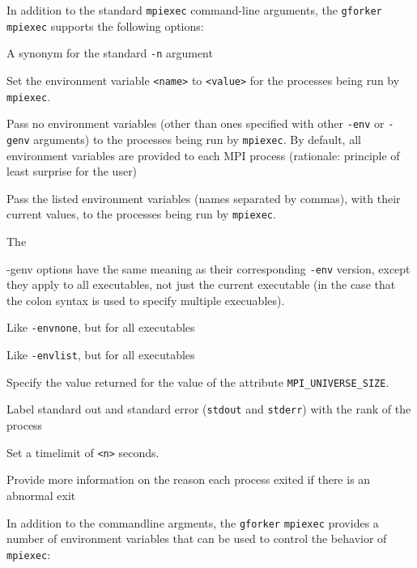 \documentclass[dvipdfm,11pt]{article}
\begin{document}
In addition to the standard \texttt{mpiexec} command-line arguments, the
\texttt{gforker} \texttt{mpiexec} supports the following options:
\begin{description}
\item[\texttt{-np <num>}]A synonym for the standard \texttt{-n} argument
\item[\texttt{-env <name> <value>}]Set the environment variable
\texttt{<name>} to \texttt{<value>} for the processes being run by
\texttt{mpiexec}.
\item[\texttt{-envnone}]Pass no environment variables (other than ones
specified with  other \texttt{-env} or \texttt{-genv} arguments) to the
processes being run by \texttt{mpiexec}. 
By default, all environment
variables are provided to each MPI process (rationale: principle of
least surprise for the user)
\item[\texttt{-envlist <list>}]Pass the listed environment variables (names
separated  by commas), with their current values, to the processes being run by
 \texttt{mpiexec}.
\item[\texttt{-genv <name> <value>}]The \item{-genv} options have the same
meaning as their corresponding \texttt{-env} version, except they apply to all
executables, not just the current executable (in the case that the colon
syntax is used to specify multiple execuables).
\item[\texttt{-genvnone}]Like \texttt{-envnone}, but for all executables
\item[\texttt{-genvlist <list>}]Like \texttt{-envlist}, but for all executables
\item[\texttt{-usize <n>}]Specify the value returned for the value of the
attribute \texttt{MPI\_UNIVERSE\_SIZE}.
\item[\texttt{-l}]Label standard out and standard error (\texttt{stdout} and \texttt{stderr}) with 
  the rank of the process
\item[\texttt{-maxtime <n>}]Set a timelimit of \texttt{<n>} seconds.
\item[\texttt{-exitinfo}]Provide more information on the reason each process
exited if there is an abnormal exit
\end{description}

In addition to the commandline argments, the \texttt{gforker} \texttt{mpiexec}
provides a number of environment variables that can be used to control the
behavior of \texttt{mpiexec}:
\end{document}
